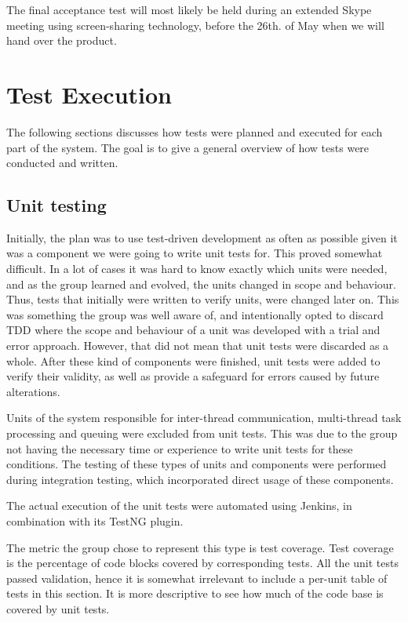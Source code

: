 The final acceptance test will most likely be held during an extended Skype meeting using screen-sharing technology, before the 26th. of May when we will hand over the product.

\section{Test Execution}
\label{subsec:testing-test_execution}

The following sections discusses how tests were planned and executed for each part of the system. The goal is to give a general overview of how tests were conducted and written.

\subsection{Unit testing}
\label{subsec:testing-test_execution-unit_testing}

Initially, the plan was to use test-driven development as often as possible given it was a component we were going to write unit tests for. This proved somewhat difficult. In a lot of cases it was hard to know exactly which units were needed, and as the group learned and evolved, the units changed in scope and behaviour. Thus, tests that initially were written to verify units, were changed later on. This was something the group was well aware of, and intentionally opted to discard TDD where the scope and behaviour of a unit was developed with a trial and error approach. However, that did not mean that unit tests were discarded as a whole. After these kind of components were finished, unit tests were added to verify their validity, as well as provide a safeguard for errors caused by future alterations.

Units of the system responsible for inter-thread communication, multi-thread task processing and queuing were excluded from unit tests. This was due to the group not having the necessary time or experience to write unit tests for these conditions. The testing of these types of units and components were performed during integration testing, which incorporated direct usage of these components.

The actual execution of the unit tests were automated using Jenkins, in combination with its TestNG plugin.

The metric the group chose to represent this type is test coverage. Test coverage is the percentage of code blocks covered by corresponding tests. All the unit tests passed validation, hence it is somewhat irrelevant to include a per-unit table of tests in this section. It is more descriptive to see how much of the code base is covered by unit tests.

